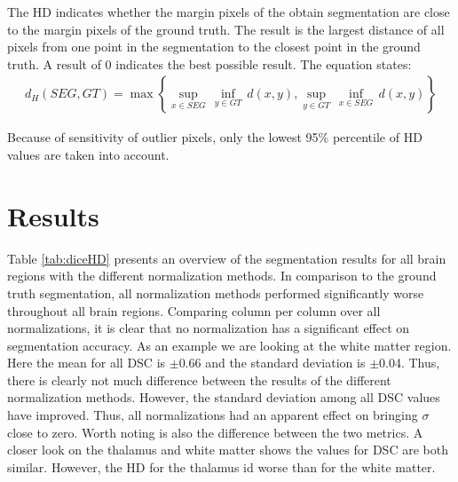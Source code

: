 \documentclass[article]{IEEEtran}
\begin{document}
	The HD indicates whether the margin pixels of the obtain segmentation are close to the margin pixels of the ground truth. 
	The result is the largest distance of all pixels from one point in the segmentation to the closest point in the ground truth.
	A result of 0 indicates the best possible result.
	The equation states:
	\begin{eqnarray*}
			d_H (SEG, GT) = \max \left\{ \underset{x\in SEG}{\mathop{\sup }}\,\underset{y\in GT}{\mathop{\inf }}\,d(x,y),\underset{y\in GT}{\mathop{\sup }}\,\underset{x\in SEG}{\mathop{\inf }}\,d(x,y) \right\}
	\end{eqnarray*}
	
	Because of sensitivity of outlier pixels, only the lowest 95\% percentile of HD values are taken into account.

	


\section{Results}

	Table \ref{tab:diceHD} presents an overview of the segmentation results for all brain regions with the different normalization methods. 
	In comparison to the ground truth segmentation, all normalization methods performed significantly worse throughout all brain regions.
	Comparing column per column over all normalizations, it is clear that no normalization has a significant effect on segmentation accuracy.
	As an example we are looking at the white matter region. 
	Here the mean for all DSC is $\pm$0.66 and the standard deviation is $\pm$0.04. 
	Thus, there is clearly not much difference between the results of the different normalization methods.
	However, the standard deviation among all DSC values have improved.
	Thus, all normalizations had an apparent effect on bringing $\sigma$ close to zero.
	Worth noting is also the difference between the two metrics. A closer look on the thalamus and white matter shows the values for DSC are both similar.
	However, the HD for the thalamus id worse than for the white matter.\smallskip
	
\end{document}
